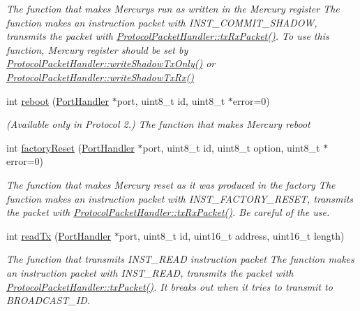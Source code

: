 \begin{DoxyCompactItemize}
\begin{DoxyCompactList}\small\item\em The function that makes Mercurys run as written in the Mercury register  The function makes an instruction packet with I\+N\+S\+T\+\_\+\+C\+O\+M\+M\+I\+T\+\_\+\+S\+H\+A\+D\+OW,  transmits the packet with \hyperlink{classmercury_1_1_protocol_packet_handler_a68b02f23af616886d0795ea12debd613}{Protocol\+Packet\+Handler\+::tx\+Rx\+Packet()}.  To use this function, Mercury register should be set by \hyperlink{classmercury_1_1_protocol_packet_handler_a38b187dbb26583cb57fb7592e4be8136}{Protocol\+Packet\+Handler\+::write\+Shadow\+Tx\+Only()} or \hyperlink{classmercury_1_1_protocol_packet_handler_a822f9e0b679c26df080a9ae7a60e741c}{Protocol\+Packet\+Handler\+::write\+Shadow\+Tx\+Rx()} \end{DoxyCompactList}\item 
int \hyperlink{classmercury_1_1_protocol_packet_handler_ada4e23e49d86234efad935480b6886f0}{reboot} (\hyperlink{classmercury_1_1_port_handler}{Port\+Handler} $\ast$port, uint8\+\_\+t id, uint8\+\_\+t $\ast$error=0)
\begin{DoxyCompactList}\small\item\em (Available only in Protocol 2.) The function that makes Mercury reboot \end{DoxyCompactList}\item 
int \hyperlink{classmercury_1_1_protocol_packet_handler_ad658bff867e99f76c3b3c7cd93572041}{factory\+Reset} (\hyperlink{classmercury_1_1_port_handler}{Port\+Handler} $\ast$port, uint8\+\_\+t id, uint8\+\_\+t option, uint8\+\_\+t $\ast$error=0)
\begin{DoxyCompactList}\small\item\em The function that makes Mercury reset as it was produced in the factory  The function makes an instruction packet with I\+N\+S\+T\+\_\+\+F\+A\+C\+T\+O\+R\+Y\+\_\+\+R\+E\+S\+ET,  transmits the packet with \hyperlink{classmercury_1_1_protocol_packet_handler_a68b02f23af616886d0795ea12debd613}{Protocol\+Packet\+Handler\+::tx\+Rx\+Packet()}.  Be careful of the use. \end{DoxyCompactList}\item 
int \hyperlink{classmercury_1_1_protocol_packet_handler_aebb2c28d6b3f2e87c7a56b757a24810b}{read\+Tx} (\hyperlink{classmercury_1_1_port_handler}{Port\+Handler} $\ast$port, uint8\+\_\+t id, uint16\+\_\+t address, uint16\+\_\+t length)
\begin{DoxyCompactList}\small\item\em The function that transmits I\+N\+S\+T\+\_\+\+R\+E\+AD instruction packet  The function makes an instruction packet with I\+N\+S\+T\+\_\+\+R\+E\+AD,  transmits the packet with \hyperlink{classmercury_1_1_protocol_packet_handler_a245f01395d9684bc58788e8a06de3ffc}{Protocol\+Packet\+Handler\+::tx\+Packet()}.  It breaks out  when it tries to transmit to B\+R\+O\+A\+D\+C\+A\+S\+T\+\_\+\+ID. \end{DoxyCompactList}\item 

\end{DoxyCompactItemize}

